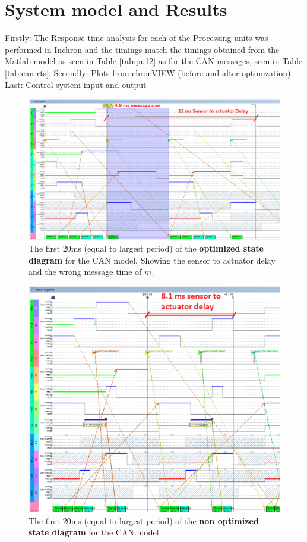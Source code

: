 \section{System model and Results}

Firstly: The Response time analysis for each of the Processing units was performed in  Inchron and the timings match the timings obtained from the Matlab model as seen in Table \ref{tab:pu12} as for the CAN messages, seen in Table \ref{tab:can-rts}. Secondly: Plots from chronVIEW (before and after optimization)\\
Last: Control system input and output

\begin{figure}[h!]
	\begin{center}
		\includegraphics[width=0.8\linewidth]{img/CAN-original}
		\caption{The first 20ms (equal to largest period) of the \textbf{optimized state diagram} for the CAN model. Showing the sensor to actuator delay and the wrong message time of $m_1$ }
		\label{fig:CANoriginal}
	\end{center}
\end{figure}

\begin{figure}[h!]
	\begin{center}
		\includegraphics[width=0.8\linewidth]{img/CAN-Optimized}
		\caption{The first 20ms (equal to largest period) of the \textbf{non optimized state diagram} for the CAN model.}
		\label{fig:CANoptimized}
	\end{center}
\end{figure}

